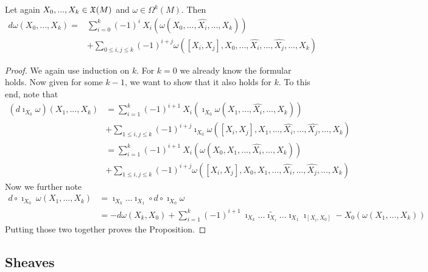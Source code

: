 \begin{prop}
  Let again  $X_0,...,X_{k} \in \mathfrak{X}(M)$ and $\omega \in \Omega^k(M)$. Then
  \begin{align}
    d\omega(X_0, ..., X_k) =& \sum_{i=0}^{k} (-1)^i \ X_i(\omega(X_0, ..., \widehat{X_i}, ..., X_k))\\
    &+ \sum_{0 \leq i,j \leq k} (-1)^{i+j} \omega([X_i,X_j], X_0, ..., \widehat{X_i}, ..., \widehat{X_j}, ..., X_k)
  \end{align}
  \begin{proof}
    We again use induction on $k$. For $k=0$ we already know the formular holds. Now given for some $k-1$, we want to show that it also holds for $k$. To this end, note that
    \begin{align}
      (d\imath_{X_0}\omega)(X_1, ..., X_k) &= \sum_{i=1}^{k} (-1)^{i+1} \ X_i(\imath_{X_0} \omega(X_1, ..., \widehat{X_i}, ..., X_k))\\
      &+  \sum_{1 \leq i,j \leq k} (-1)^{i+j} \imath_{X_0} \omega([X_i,X_j], X_1, ..., \widehat{X_i}, ..., \widehat{X_j}, ..., X_k)\\
      &= \sum_{i=1}^{k} (-1)^{i+1} \ X_i( \omega(X_0, X_1, ..., \widehat{X_i}, ..., X_k))\\
      &+  \sum_{1 \leq i,j \leq k} (-1)^{i+j} \omega([X_i,X_j],X_0,  X_1, ..., \widehat{X_i}, ..., \widehat{X_j}, ..., X_k)
    \end{align}
    Now we further note
    \begin{align}
      d\circ \imath_{X_0}\ \omega(X_1, ..., X_k) &= \imath_{X_k} ... \imath_{X_1} \circ d\circ \imath_{X_0} \omega\\
      &= -d\omega(X_k, X_0) + \sum_{i=1}^k (-1)^{i+1} \ \imath_{X_k} ... \widetilde{\imath_{X_i}} ... \imath_{X_1} \imath_{[X_i, X_0]} - X_0 (\omega(X_1, ..., X_k))
    \end{align}
    Putting those two together proves the Proposition.
  \end{proof}
\end{prop}

\newpage
\subsection{Sheaves}

